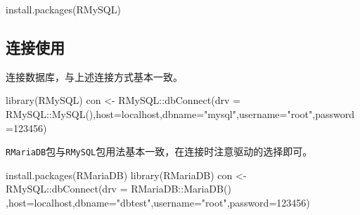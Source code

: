\documentclass[
]{book}
\newenvironment{Shaded}{\begin{snugshade}}{\end{snugshade}}
\newcommand{\AttributeTok}[1]{\textcolor[rgb]{0.77,0.63,0.00}{#1}}
\newcommand{\FunctionTok}[1]{\textcolor[rgb]{0.00,0.00,0.00}{#1}}
\newcommand{\NormalTok}[1]{#1}
\newcommand{\OtherTok}[1]{\textcolor[rgb]{0.56,0.35,0.01}{#1}}
\newcommand{\SpecialCharTok}[1]{\textcolor[rgb]{0.00,0.00,0.00}{#1}}
\newcommand{\StringTok}[1]{\textcolor[rgb]{0.31,0.60,0.02}{#1}}
\begin{document}
\begin{Shaded}
\begin{Highlighting}[]
\FunctionTok{install.packages}\NormalTok{(}\StringTok{\textquotesingle{}RMySQL\textquotesingle{}}\NormalTok{)}
\end{Highlighting}
\end{Shaded}

\hypertarget{ux8fdeux63a5ux4f7fux7528}{%
\subsection{连接使用}\label{ux8fdeux63a5ux4f7fux7528}}

连接数据库，与上述连接方式基本一致。

\begin{Shaded}
\begin{Highlighting}[]
\FunctionTok{library}\NormalTok{(RMySQL)}
\NormalTok{con }\OtherTok{\textless{}{-}}\NormalTok{ RMySQL}\SpecialCharTok{::}\FunctionTok{dbConnect}\NormalTok{(}\AttributeTok{drv =}\NormalTok{ RMySQL}\SpecialCharTok{::}\FunctionTok{MySQL}\NormalTok{(),}\AttributeTok{host=}\StringTok{\textquotesingle{}localhost\textquotesingle{}}\NormalTok{,}\AttributeTok{dbname=}\StringTok{"mysql"}\NormalTok{,}\AttributeTok{username=}\StringTok{"root"}\NormalTok{,}\AttributeTok{password=}\StringTok{\textquotesingle{}123456\textquotesingle{}}\NormalTok{)}
\end{Highlighting}
\end{Shaded}

\texttt{RMariaDB}包与\texttt{RMySQL}包用法基本一致，在连接时注意驱动的选择即可。

\begin{Shaded}
\begin{Highlighting}[]
\FunctionTok{install.packages}\NormalTok{(}\StringTok{\textquotesingle{}RMariaDB\textquotesingle{}}\NormalTok{)}
\FunctionTok{library}\NormalTok{(RMariaDB)}
\NormalTok{con }\OtherTok{\textless{}{-}}\NormalTok{ RMySQL}\SpecialCharTok{::}\FunctionTok{dbConnect}\NormalTok{(}\AttributeTok{drv =}\NormalTok{ RMariaDB}\SpecialCharTok{::}\FunctionTok{MariaDB}\NormalTok{() ,}\AttributeTok{host=}\StringTok{\textquotesingle{}localhost\textquotesingle{}}\NormalTok{,}\AttributeTok{dbname=}\StringTok{"dbtest"}\NormalTok{,}\AttributeTok{username=}\StringTok{"root"}\NormalTok{,}\AttributeTok{password=}\StringTok{\textquotesingle{}123456\textquotesingle{}}\NormalTok{)}
\end{Highlighting}
\end{Shaded}
\end{document}
